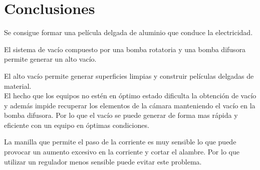 \documentclass[journal]{IEEEtran}
\begin{document}
\section{Conclusiones}
Se consigue formar una película delgada de aluminio que conduce la electricidad.

El sistema de vacío compuesto por una bomba rotatoria y una bomba difusora permite generar un alto vacío.

El alto vacío permite generar superficies limpias y construir películas delgadas de material.\\

El hecho que los equipos no estén en óptimo estado dificulta la obtención de vacío y además impide recuperar los elementos de la cámara manteniendo el vacío en la bomba difusora. Por lo que el vacío se puede generar de forma mas rápida y eficiente con un equipo en óptimas condiciones.

La manilla que permite el paso de la corriente es muy sensible lo que puede provocar un aumento excesivo en la corriente y cortar el alambre. Por lo que utilizar un regulador menos sensible puede evitar este problema.






\ifCLASSOPTIONcaptionsoff
  \newpage
\fi

\end{document}
